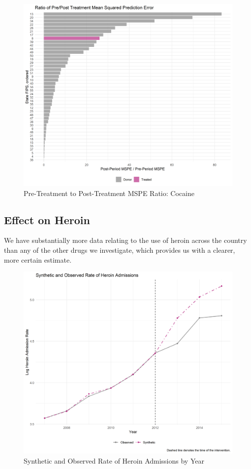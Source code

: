 \documentclass{article}
\begin{document}
\begin{figure}[H]
    \begin{center}
        \includegraphics[width=.85\textwidth]{Figure_MSPERat_Cocaine.png}
    \end{center}
    \caption{Pre-Treatment to Post-Treatment MSPE Ratio: Cocaine}
    \label{fig:CocMSPER}
\end{figure}

\subsection*{Effect on Heroin}

We have substantially more data relating to the use of heroin across the country than any of the other drugs we investigate, which provides us with a clearer, more certain estimate.

\begin{figure}[H]
    \begin{center}
        \includegraphics[width=.85\textwidth]{Figure_Trend_Heroin.png}
    \end{center}
    \caption{Synthetic and Observed Rate of Heroin Admissions by Year}
    \label{fig:HerTrend}
\end{figure}
\end{document}
